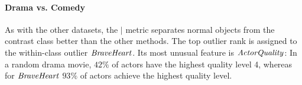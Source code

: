																		\paragraph{Drama vs. Comedy} 
																		As with the other datasets, the  $\mid$ metric separates normal objects  from the contrast class better than the other methods.   
																		The top outlier rank is assigned to the within-class outlier $\it{Brave Heart}$. Its most  unusual feature is  $\it{ActorQuality}$: In a random drama movie,  $42\%$ of actors have the highest quality level 4, whereas for $\it{Brave Heart}$ $93\%$ of actors achieve the highest quality level. 
																		
